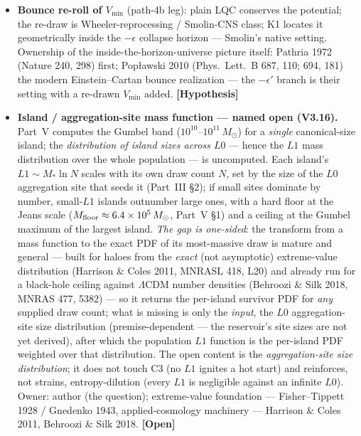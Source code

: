 \documentclass[11pt]{article}
\newcommand{\hyp}{\textcolor{orange!80!black}{\textbf{[Hypothesis]}}}
\newcommand{\open}{\textcolor{red!70!black}{\textbf{[Open]}}}
\newcommand{\msun}{M_\odot}
\begin{document}
\begin{itemize}[leftmargin=2.6em,itemsep=3pt]
\item[\textbf{(L)}] \textbf{Bounce re-roll of $V_{\min}$} (path-4b leg): plain LQC conserves the potential; the re-draw is Wheeler-reprocessing / Smolin-CNS class; K1 locates it geometrically inside the $-\epsilon$ collapse horizon --- Smolin's native setting. Ownership of the inside-the-horizon-universe picture itself: Pathria 1972 (Nature 240, 298) first; Pop\l awski 2010 (Phys.\ Lett.\ B 687, 110; 694, 181) the modern Einstein--Cartan bounce realization --- the $-\epsilon'$ branch is their setting with a re-drawn $V_{\min}$ added. \hyp

\item[\textbf{(M)}] \textbf{Island / aggregation-site mass function --- named open (V3.16).} Part~V computes the Gumbel band ($10^{10}$--$10^{11}\,\msun$) for a \emph{single} canonical-size island; the \emph{distribution of island sizes across $L0$} --- hence the $L1$ mass distribution over the whole population --- is uncomputed. Each island's $L1\sim M_*\ln N$ scales with its own draw count $N$, set by the size of the $L0$ aggregation site that seeds it (Part~III \S2); if small sites dominate by number, small-$L1$ islands outnumber large ones, with a hard floor at the Jeans scale ($M_{\rm floor}\approx6.4\times10^{5}\,\msun$, Part~V \S1) and a ceiling at the Gumbel maximum of the largest island. \emph{The gap is one-sided}: the transform from a mass function to the exact PDF of its most-massive draw is mature and general --- built for haloes from the \emph{exact} (not asymptotic) extreme-value distribution (Harrison \& Coles 2011, MNRASL 418, L20) and already run for a black-hole ceiling against $\Lambda$CDM number densities (Behroozi \& Silk 2018, MNRAS 477, 5382) --- so it returns the per-island survivor PDF for \emph{any} supplied draw count; what is missing is only the \emph{input}, the $L0$ aggregation-site size distribution (premise-dependent --- the reservoir's site sizes are not yet derived), after which the population $L1$ function is the per-island PDF weighted over that distribution. The open content is the \emph{aggregation-site size distribution}; it does not touch C3 (no $L1$ ignites a hot start) and reinforces, not strains, entropy-dilution (every $L1$ is negligible against an infinite $L0$). Owner: author (the question); extreme-value foundation --- Fisher--Tippett 1928 / Gnedenko 1943, applied-cosmology machinery --- Harrison \& Coles 2011, Behroozi \& Silk 2018. \open
\end{itemize}
\end{document}
